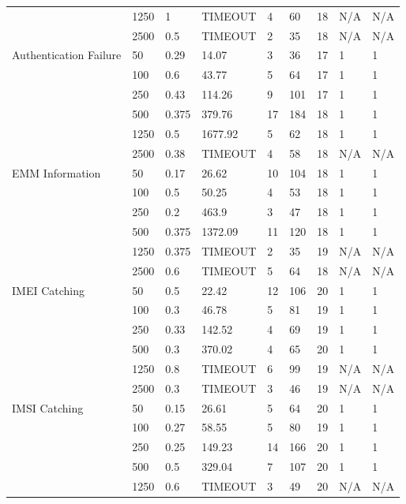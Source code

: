 \begin{table*}[]
{\begin{minipage}{2\columnwidth}
\begin{tabular}{|l|l|l|l|l|l|l|l|l|}
   & 1250 & 1 & TIMEOUT & 4 & 60 & 18 & N/A & N/A \\ \cline{2-9}
   & 2500 & 0.5 & TIMEOUT & 2 & 35 & 18 & N/A & N/A \\ \hline
  \multirow{6}{*}{Authentication Failure} & 50 & 0.29 & 14.07 & 3 & 36 & 17 & 1 & 1 \\ \cline{2-9}
   & 100 & 0.6 & 43.77 & 5 & 64 & 17 & 1 & 1 \\ \cline{2-9}
   & 250 & 0.43 & 114.26 & 9 & 101 & 17 & 1 & 1 \\ \cline{2-9}
   & 500 & 0.375 & 379.76 & 17 & 184 & 18 & 1 & 1 \\ \cline{2-9}
   & 1250 & 0.5 & 1677.92 & 5 & 62 & 18 & 1 & 1 \\ \cline{2-9}
   & 2500 & 0.38 & TIMEOUT & 4 & 58 & 18 & N/A & N/A \\ \hline
  \multirow{6}{*}{EMM Information} & 50 & 0.17 & 26.62 & 10 & 104 & 18 & 1 & 1 \\ \cline{2-9}
   & 100 & 0.5 & 50.25 & 4 & 53 & 18 & 1 & 1 \\ \cline{2-9}
   & 250 & 0.2 & 463.9 & 3 & 47 & 18 & 1 & 1 \\ \cline{2-9}
   & 500 & 0.375 & 1372.09 & 11 & 120 & 18 & 1 & 1 \\ \cline{2-9}
   & 1250 & 0.375 & TIMEOUT & 2 & 35 & 19 & N/A & N/A \\ \cline{2-9}
   & 2500 & 0.6 & TIMEOUT & 5 & 64 & 18 & N/A & N/A \\ \hline
  \multirow{6}{*}{IMEI Catching} & 50 & 0.5 & 22.42 & 12 & 106 & 20 & 1 & 1 \\ \cline{2-9}
   & 100 & 0.3 & 46.78 & 5 & 81 & 19 & 1 & 1 \\ \cline{2-9}
   & 250 & 0.33 & 142.52 & 4 & 69 & 19 & 1 & 1 \\ \cline{2-9}
   & 500 & 0.3 & 370.02 & 4 & 65 & 20 & 1 & 1 \\ \cline{2-9}
   & 1250 & 0.8 & TIMEOUT & 6 & 99 & 19 & N/A & N/A \\ \cline{2-9}
   & 2500 & 0.3 & TIMEOUT & 3 & 46 & 19 & N/A & N/A \\ \hline
  \multirow{6}{*}{IMSI Catching} & 50 & 0.15 & 26.61 & 5 & 64 & 20 & 1 & 1 \\ \cline{2-9}
   & 100 & 0.27 & 58.55 & 5 & 80 & 19 & 1 & 1 \\ \cline{2-9}
   & 250 & 0.25 & 149.23 & 14 & 166 & 20 & 1 & 1 \\ \cline{2-9}
   & 500 & 0.5 & 329.04 & 7 & 107 & 20 & 1 & 1 \\ \cline{2-9}
   & 1250 & 0.6 & TIMEOUT & 3 & 49 & 20 & N/A & N/A \\ \cline{2-9}

\end{tabular}
\end{minipage}}
\end{table*}

